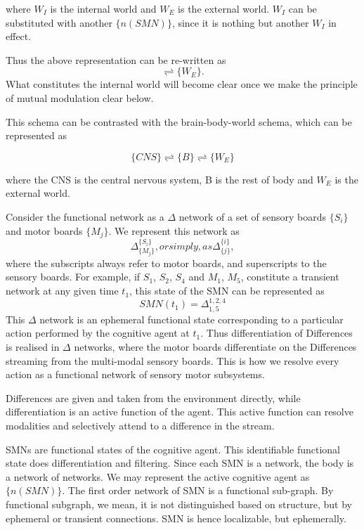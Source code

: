 where $W_I$ is the internal world and $W_E$ is the external world.  $W_I$ can be substituted with another $\{n(SMN)\}$, since it is nothing but another $W_I$ in effect. 

Thus the above representation can be re-written as 
\begin{equation}
[\{n(SMN)\}_i \rightleftharpoons \{n(SMN)\}_j] \rightleftharpoons \{W_E\}.
\end{equation}
What constitutes the internal world will become clear once we make the principle of mutual modulation clear below.

This schema can be contrasted with the brain-body-world schema, which can be represented as 

\begin{equation}
\{CNS\} \rightleftharpoons \{B\} \rightleftharpoons \{W_E\}
\end{equation}

where the CNS is the central nervous system, B is the rest of body and $W_E$ is the external world.

Consider the functional network as a $\Delta$ network of a set of sensory boards $\{S_i\}$ and motor boards $\{M_j\}$. We represent this network as 
\begin{equation}\label{delta_notation}\Delta^{\{S_i\}}_{\{M_j\}}, or simply, as  \Delta^{\{i\}}_{\{j\}},
\end{equation} 
where the subscripts always refer to motor boards, and superscripts to the sensory boards. For example, if $S_1$, $S_2$, $S_4$ and $M_1$, $M_5$, constitute a transient network at any given time $t_1$, this state of the SMN can be represented as 
\begin{equation}\label{delta_eg}SMN(t_1) = \Delta^{1,2,4}_{1,5}
\end{equation} 
This $\Delta$ network is an ephemeral functional state corresponding to a particular action performed by the cognitive agent at $t_1$. Thus differentiation of Differences is realised in $\Delta$ networks, where the motor boards differentiate on the Differences streaming from the multi-modal sensory boards. This is how we resolve every action as a functional network of sensory motor subsystems.

Differences are given and taken from the environment directly, while differentiation is an active function of the agent. This active function can resolve modalities and selectively attend to a difference in the stream.

SMNs are functional states of the cognitive agent. This identifiable functional state does differentiation and filtering. Since each SMN is a network, the body is a network of networks. We may represent the active cognitive agent as $\{n(SMN)\}$. The first order network of SMN is a functional sub-graph. By functional subgraph, we mean, it is not distinguished based on structure, but by ephemeral or transient connections. SMN is hence localizable, but ephemerally.

